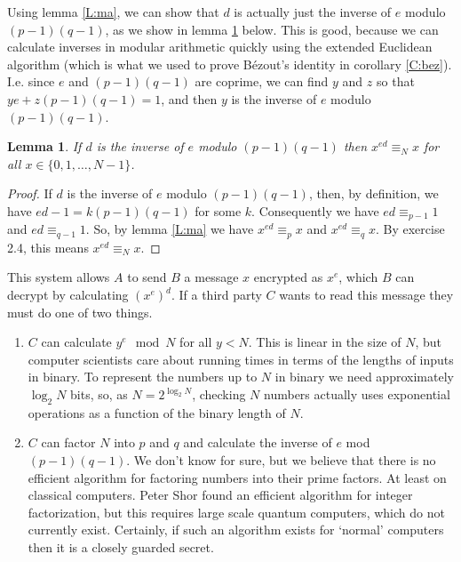 \documentclass{article}
\theoremstyle{plain}
\newtheorem{lemma}[theorem]{Lemma}{\bfseries}{\upshape}
\begin{document}
Using lemma \ref{L:ma}, we can show that $d$ is actually just the inverse of $e$ modulo $(p-1)(q-1)$, as we show in lemma \ref{L:prop} below. This is good, because we can calculate inverses in modular arithmetic quickly using the extended Euclidean algorithm (which is what we used to prove B\'ezout's identity in corollary \ref{C:bez}). I.e. since $e$ and $(p-1)(q-1)$ are coprime, we can find $y$ and $z$ so that $ye + z(p-1)(q-1) = 1$, and then $y$ is the inverse of $e$ modulo $(p-1)(q-1)$.

\begin{lemma}\label{L:prop}
If $d$ is the inverse of $e$ modulo $(p-1)(q-1)$ then $x^{ed} \equiv_N x$ for all $x\in\{0,1,\ldots,N-1\}$.
\end{lemma}
\begin{proof}
If $d$ is the inverse of $e$ modulo $(p-1)(q-1)$, then, by definition, we have $ed-1 = k(p-1)(q-1)$
for some $k$. Consequently we have $ed \equiv_{p-1} 1$ and $ed\equiv_{q-1} 1$. So, by lemma \ref{L:ma} we have $x^{ed} \equiv_p x$ and $x^{ed} \equiv_q x$. By exercise 2.4, this means $x^{ed} \equiv_N x$.

\end{proof} 

This system allows $A$ to send $B$ a message $x$ encrypted as $x^e$, which $B$ can decrypt by calculating $(x^e)^d$. If a third party $C$ wants to read this message they must do one of two things.

\begin{enumerate}
\item $C$ can calculate $y^e\mod N$ for all $y<N$. This is linear in the size of $N$, but computer scientists care about running times in terms of the lengths of inputs in binary. To represent the numbers up to $N$ in binary we need approximately $\log_2 N$ bits, so, as $N=2^{\log_2 N}$, checking $N$ numbers actually uses exponential operations as a function of the binary length of $N$.  
\item $C$ can factor $N$ into $p$ and $q$ and calculate the inverse of $e$ mod $(p-1)(q-1)$. We don't know for sure, but we believe that there is no efficient algorithm for factoring numbers into their prime factors. At least on classical computers. Peter Shor found an efficient algorithm for integer factorization, but this requires large scale quantum computers, which do not currently exist. Certainly, if such an algorithm exists for `normal' computers then it is a closely guarded secret. 
\end{enumerate}
\end{document}
